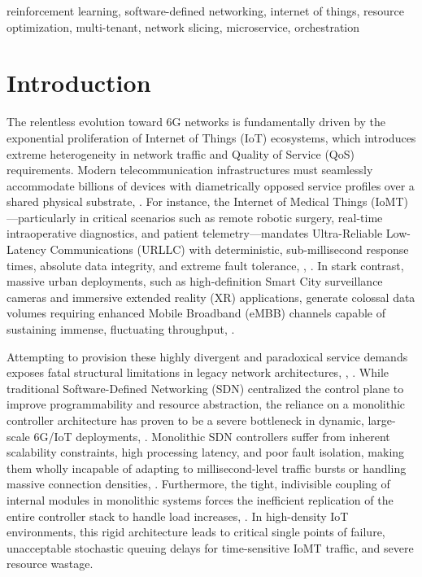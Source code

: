 \documentclass[conference]{IEEEtran}
\begin{document}
\begin{IEEEkeywords}
reinforcement learning, software-defined networking, internet of things, resource optimization, multi-tenant, network slicing, microservice, orchestration
\end{IEEEkeywords}

\section{Introduction}\label{sec:intro}

The relentless evolution toward 6G networks is fundamentally driven by the exponential proliferation of Internet of Things (IoT) ecosystems, which introduces extreme heterogeneity in network traffic and Quality of Service (QoS) requirements\cite{b1}. Modern telecommunication infrastructures must seamlessly accommodate billions of devices with diametrically opposed service profiles over a shared physical substrate\cite{b2}, \cite{b3}. For instance, the Internet of Medical Things (IoMT)---particularly in critical scenarios such as remote robotic surgery, real-time intraoperative diagnostics, and patient telemetry---mandates Ultra-Reliable Low-Latency Communications (URLLC) with deterministic, sub-millisecond response times, absolute data integrity, and extreme fault tolerance\cite{b1}, \cite{b4}, \cite{b5}. In stark contrast, massive urban deployments, such as high-definition Smart City surveillance cameras and immersive extended reality (XR) applications, generate colossal data volumes requiring enhanced Mobile Broadband (eMBB) channels capable of sustaining immense, fluctuating throughput\cite{b4}, \cite{b6}.

Attempting to provision these highly divergent and paradoxical service demands exposes fatal structural limitations in legacy network architectures\cite{b1}, \cite{b7}, \cite{b8}. While traditional Software-Defined Networking (SDN) centralized the control plane to improve programmability and resource abstraction, the reliance on a monolithic controller architecture has proven to be a severe bottleneck in dynamic, large-scale 6G/IoT deployments\cite{b8}, \cite{b9}. Monolithic SDN controllers suffer from inherent scalability constraints, high processing latency, and poor fault isolation, making them wholly incapable of adapting to millisecond-level traffic bursts or handling massive connection densities\cite{b8}, \cite{b9}. Furthermore, the tight, indivisible coupling of internal modules in monolithic systems forces the inefficient replication of the entire controller stack to handle load increases\cite{b8}, \cite{b9}. In high-density IoT environments, this rigid architecture leads to critical single points of failure, unacceptable stochastic queuing delays for time-sensitive IoMT traffic, and severe resource wastage\cite{b9}.
\end{document}
